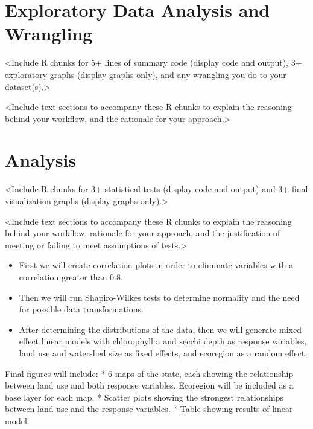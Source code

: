 \documentclass[12pt,]{article}
\providecommand{\tightlist}{%
  \setlength{\itemsep}{0pt}\setlength{\parskip}{0pt}}
\begin{document}
\newpage

\hypertarget{exploratory-data-analysis-and-wrangling}{%
\section{Exploratory Data Analysis and
Wrangling}\label{exploratory-data-analysis-and-wrangling}}

\textless{}Include R chunks for 5+ lines of summary code (display code
and output), 3+ exploratory graphs (display graphs only), and any
wrangling you do to your dataset(s).\textgreater{}

\textless{}Include text sections to accompany these R chunks to explain
the reasoning behind your workflow, and the rationale for your
approach.\textgreater{}

\newpage

\hypertarget{analysis}{%
\section{Analysis}\label{analysis}}

\textless{}Include R chunks for 3+ statistical tests (display code and
output) and 3+ final visualization graphs (display graphs
only).\textgreater{}

\textless{}Include text sections to accompany these R chunks to explain
the reasoning behind your workflow, rationale for your approach, and the
justification of meeting or failing to meet assumptions of
tests.\textgreater{}

\begin{itemize}
\tightlist
\item
  First we will create correlation plots in order to eliminate variables
  with a correlation greater than 0.8.
\item
  Then we will run Shapiro-Wilkes tests to determine normality and the
  need for possible data transformations.
\item
  After determining the distributions of the data, then we will generate
  mixed effect linear models with chlorophyll a and secchi depth as
  response variables, land use and watershed size as fixed effects, and
  ecoregion as a random effect.
\end{itemize}

Final figures will include: * 6 maps of the state, each showing the
relationship between land use and both response variables. Ecoregion
will be included as a base layer for each map. * Scatter plots showing
the strongest relationships between land use and the response variables.
* Table showing results of linear model.
\end{document}
